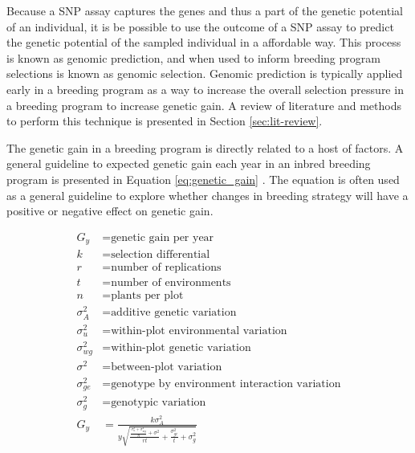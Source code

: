 Because a SNP assay captures the genes and thus a part of the genetic potential of an 
individual, it is be possible to use the outcome of a SNP assay to predict the genetic
potential of the sampled individual in a affordable way. This process is known 
as genomic prediction, and when used to inform breeding 
program selections is known as genomic selection. Genomic prediction is typically 
applied early in a breeding program as a way to increase the overall selection 
pressure in a breeding program to increase genetic gain. A review of literature
and methods to perform this technique is presented in Section \ref{sec:lit-review}. 

The genetic gain in a breeding program is directly related to a host of factors. A 
general guideline to expected genetic gain each year in an inbred breeding 
program is presented in Equation \ref{eq:genetic_gain} \citep{fehr1987}. The equation is
often used as a general guideline to explore whether changes in breeding strategy will
have a positive or negative effect on genetic gain. 

\begin{equation} \label{eq:genetic_gain}
\begin{split}
    G_y           &= \textrm{genetic gain per year} \\
    k             &= \textrm{selection differential} \\
    r             &= \textrm{number of replications} \\
    t             &= \textrm{number of environments} \\
    n             &= \textrm{plants per plot} \\
    \sigma^2_{A}  &= \textrm{additive genetic variation} \\
    \sigma^2_{u}  &= \textrm{within-plot environmental variation} \\
    \sigma^2_{wg} &= \textrm{within-plot genetic variation} \\
    \sigma^2      &= \textrm{between-plot variation} \\
    \sigma^2_{ge} &= \textrm{genotype by environment interaction variation} \\
    \sigma^2_{g}  &= \textrm{genotypic variation} \\
    G_y           &= \frac{k\sigma^2_A}{y \sqrt{ \frac{\frac{\sigma^2_{u} + \sigma^2_{wg}}{n} + \sigma^2}{rt} + \frac{\sigma^2_{ge}}{t} + \sigma^2_{g} }} \\
\end{split}
\end{equation}

